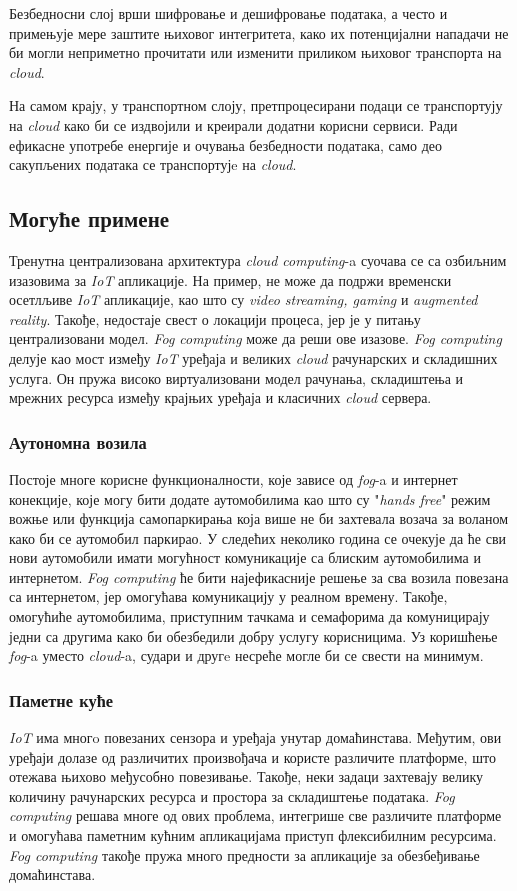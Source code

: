 Безбедносни слој врши шифровање и дешифровање података, а често и примењује мере заштите њиховог интегритета, како их потенцијални нападачи не би могли неприметно прочитати или изменити приликом њиховог транспорта на \textit{cloud}.

На самом крају, у транспортном слоју, претпроцесирани подаци се транспортују на \textit{cloud} како би се издвојили и креирали додатни корисни сервиси. Ради ефикасне употребе енергије и очувања безбедности података, само део сакупљених података се транспортујe на \textit{cloud}. 

\subsection{Могуће примене}

Тренутна централизована архитектура \textit{cloud computing}-a суочава се са озбиљним изазовима за \textit{IoT} апликације. На пример, не може да подржи временски осетлљиве \textit{IoT} апликације, као што су \textit{video streaming, gaming} и \textit{augmented reality}. Такође, недостаје свест о локацији процеса, јер је у питању централизовани модел. \textit{Fog computing} може да реши ове изазове. \textit{Fog computing} делује као мост између \textit{IoT} уређаја и великих \textit{cloud} рачунарских и складишних услуга. Он пружа високо виртуализовани модел рачунања, складиштења и мрежних ресурса између крајњих уређаја и класичних \textit{cloud} сервера.

\subsubsection{Аутономна возила}

Постоје многе корисне функционалности, које зависе од \textit{fog}-a и интернет конекције, које могу бити додате аутомобилима као што су "\textit{hands free}" режим вожње или функција самопаркирања која више не би захтевала возача за воланом како би се аутомобил паркирао.
У следећих неколико година се очекује да ће сви нови аутомобили имати могућност комуникације са блиским аутомобилима и интернетом. \textit{Fog computing} ће бити најефикасније решење за сва возила повезана са интернетом, јер омогућава комуникацију у реалном времену. Такође, омогућиће аутомобилима, приступним тачкама и семафорима да комуницирају једни са другима како би обезбедили добру услугу корисницима.
Уз коришћење \textit{fog}-a уместо \textit{cloud}-a, судари и другe несреће могле би се свести на минимум.

\subsubsection{Паметне куће}

\textit{IoT} има многo повезаних сензора и уређаја унутар домаћинстава. Међутим, ови уређаји долазе од различитих произвођача и користе различите платформе, што отежава њихово међусобно повезивање. Такође, неки задаци захтевају велику количину рачунарских ресурса и простора за складиштење података. \textit{Fog computing} решава многе од ових проблема, интегрише све различите платформе и омогућава паметним кућним апликацијама приступ флексибилним ресурсима. \textit{Fog computing} такође пружа много предности за апликације за обезбеђивање домаћинстава.